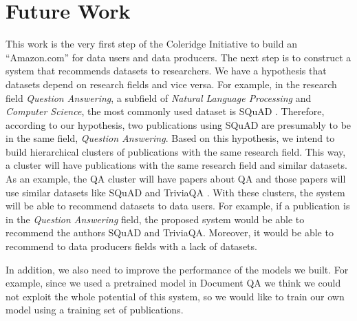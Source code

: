 \documentclass[11pt]{article}
\begin{document}
\section{Future Work}
This work is the very first step of the  
Coleridge Initiative to build an “Amazon.com” for data users and data producers. The next step is to construct a system that recommends datasets to researchers. We have a hypothesis that datasets depend on research fields and vice versa. For example, in the research field \textit{Question Answering}, a subfield of \textit{Natural Language Processing} and \textit{Computer Science}, the most commonly used dataset is SQuAD \cite{rajpurkar2016squad}. Therefore, according to our hypothesis, two publications using SQuAD are presumably to be in the same field,  \textit{Question Answering}. Based on this hypothesis, we intend to build hierarchical clusters of publications with the same research field. This way, a cluster will have publications with the same research field and similar datasets. As an example, the QA cluster will have papers about QA and those papers will use similar datasets like SQuAD and TriviaQA \cite{joshi2017triviaqa}. With these clusters, the system will be able to recommend datasets to data users. For example, if a publication is in the \textit{Question Answering} field, the proposed system would be able to recommend the authors SQuAD and TriviaQA. Moreover, it would be able to recommend to data producers fields with a lack of datasets.

In addition, we also need to improve the performance of the models we built. For example, since we used a pretrained model in Document QA we think we could not exploit the whole potential of this system, so we would like to train our own model using a training set of publications.  

%
%



\end{document}

